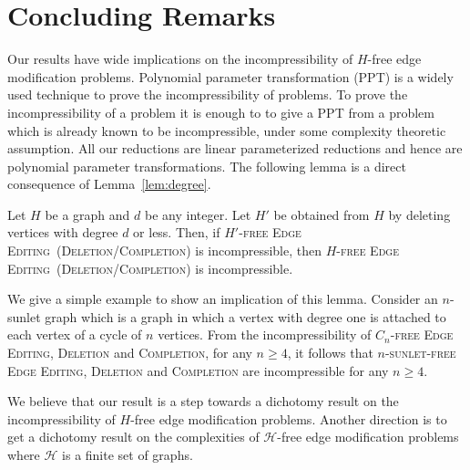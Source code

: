 \documentclass[envcountsame,envcountsect,10pt,oribibl]{llncs}
\newcommand{\pname}[1]{\textnormal{\textsc{#1}}}
\newcommand{\HEE}{\pname{$H$-free Edge Editing}}
\newcommand{\HDEE}{\pname{$H'$-free Edge Editing}}
\begin{document}
\section{Concluding Remarks}

Our results have wide implications on the incompressibility of 
$H$-free edge modification problems. Polynomial parameter transformation (PPT)
is a widely used technique to prove the incompressibility of 
problems. To prove the incompressibility of a problem
it is enough to to give a PPT from a problem which is already
known to be incompressible, under some complexity theoretic assumption.
All our reductions are
linear parameterized reductions and hence are polynomial
parameter transformations. The following lemma is a
direct consequence of Lemma~\ref{lem:degree}.

\begin{lemma}
  \label{lem:incompressibility}
  Let $H$ be a graph and $d$ be any integer. 
  Let $H'$ be obtained from $H$ by deleting vertices with degree $d$ or less.
  Then, if \HDEE~(\textsc{Deletion}/\textsc{Completion})
  is incompressible, then \HEE~(\textsc{Deletion}/\textsc{Completion}) is incompressible.
\end{lemma}

We give a simple example to show an implication of this lemma. Consider an 
$n$-sunlet graph which is a graph in which 
a vertex with degree one is attached to each vertex of a cycle of $n$ vertices.
From the incompressibility of \textsc{$C_n$-free Edge Editing}, \textsc{Deletion} and \textsc{Completion},
for any $n\geq 4$, it follows that \textsc{$n$-sunlet-free Edge Editing}, \textsc{Deletion} and \textsc{Completion}
are incompressible for any $n\geq 4$.

We believe that our result is a step towards a dichotomy result on the incompressibility of $H$-free
edge modification problems. 
Another direction is to get a dichotomy result on the complexities of $\mathcal{H}$-free edge modification
problems where $\mathcal{H}$ is a finite set of graphs. 





\end{document}
